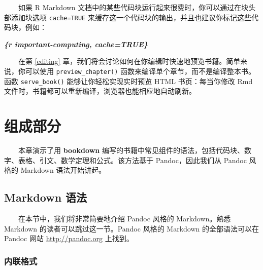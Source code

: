 \documentclass[
  12pt,
]{krantz}
\newenvironment{Shaded}{\begin{snugshade}}{\end{snugshade}}
\newcommand{\InformationTok}[1]{\textcolor[rgb]{0.56,0.35,0.01}{\textbf{\textit{#1}}}}
\theoremstyle{definition}
\theoremstyle{definition}
\theoremstyle{definition}
\theoremstyle{definition}
\theoremstyle{remark}
\begin{document}
  如果 R Markdown 文档中的某些代码块运行起来很费时，你可以通过在块头部添加块选项 \texttt{cache=TRUE} 来缓存这一个代码块的输出，并且也建议你标记这些代码块，例如：

\begin{Shaded}
\begin{Highlighting}[]
\InformationTok{\textasciigrave{}\textasciigrave{}\textasciigrave{}\{r important{-}computing, cache=TRUE\}}
\end{Highlighting}
\end{Shaded}

  在第 \ref{editing} 章，我们将会讨论如何在你编辑时快速地预览书籍。简单来说，你可以使用 \texttt{preview\_chapter()} 函数来编译单个章节，而不是编译整本书。函数 \texttt{serve\_book()} 能够让你轻松实现实时预览 HTML 书页：每当你修改 Rmd 文件时，书籍都可以重新编译，浏览器也能相应地自动刷新。

\hypertarget{components}{%
\chapter{组成部分}\label{components}}

  本章演示了用 \textbf{bookdown} 编写的书籍中常见组件的语法，包括代码块、数字、表格、引文、数学定理和公式。该方法基于 Pandoc，因此我们从 Pandoc 风格的 Markdown 语法开始讲起。

\hypertarget{markdown-syntax}{%
\section{Markdown 语法}\label{markdown-syntax}}

  在本节中，我们将非常简要地介绍 Pandoc 风格的 Markdown。熟悉 Markdown 的读者可以跳过这一节。Pandoc 风格的 Markdown 的全部语法可以在 Pandoc 网站 \url{http://pandoc.org} 上找到。

\hypertarget{ux5185ux8054ux683cux5f0f}{%
\subsection{内联格式}\label{ux5185ux8054ux683cux5f0f}}
\end{document}
